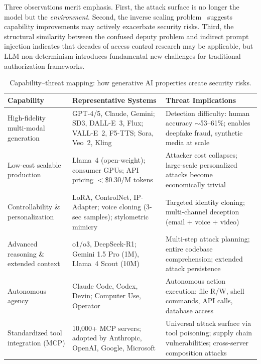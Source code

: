 Three observations merit emphasis. First, the attack surface is no longer the model but the \emph{environment}. Second, the inverse scaling problem~\cite{wang2025mcptox} suggests capability improvements may actively exacerbate security risks. Third, the structural similarity between the confused deputy problem and indirect prompt injection indicates that decades of access control research may be applicable, but LLM non-determinism introduces fundamental new challenges for traditional authorization frameworks.

\begin{table}[htbp]
\centering
\caption{Capability--threat mapping: how generative AI properties create security risks.}
\label{tab:cap-threat}
\small
\begin{tabular}{p{3.2cm}p{4.2cm}p{5.5cm}}
\toprule
\textbf{Capability} & \textbf{Representative Systems} & \textbf{Threat Implications} \\
\midrule
High-fidelity multi-modal generation &
GPT-4/5, Claude, Gemini; SD3, DALL-E~3, Flux; VALL-E~2, F5-TTS; Sora, Veo~2, Kling &
Detection difficulty: human accuracy $\sim$53--61\%; enables deepfake fraud, synthetic media at scale \\
\addlinespace
Low-cost scalable production &
Llama~4 (open-weight); consumer GPUs; API pricing $<$\$0.30/M tokens &
Attacker cost collapses; large-scale personalized attacks become economically trivial \\
\addlinespace
Controllability \& personalization &
LoRA, ControlNet, IP-Adapter; voice cloning (3-sec samples); stylometric mimicry &
Targeted identity cloning; multi-channel deception (email + voice + video) \\
\addlinespace
Advanced reasoning \& extended context &
o1/o3, DeepSeek-R1; Gemini 1.5 Pro (1M), Llama~4 Scout (10M) &
Multi-step attack planning; entire codebase comprehension; extended attack persistence \\
\addlinespace
Autonomous agency &
Claude Code, Codex, Devin; Computer Use, Operator &
Autonomous action execution: file R/W, shell commands, API calls, database access \\
\addlinespace
Standardized tool integration (MCP) &
10,000+ MCP servers; adopted by Anthropic, OpenAI, Google, Microsoft &
Universal attack surface via tool poisoning; supply chain vulnerabilities; cross-server composition attacks \\
\bottomrule
\end{tabular}
\end{table}
